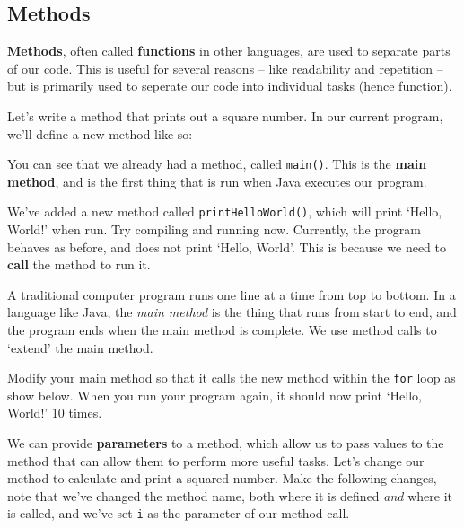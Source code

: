 	\subsection{Methods}
	
	\textbf{Methods}, often called \textbf{functions} in other languages, are used to separate parts of our code. This is useful for several reasons -- like readability and repetition -- but is primarily used to seperate our code into individual tasks (hence function).
	
	Let's write a method that prints out a square number. In our current program, we'll define a new method like so:
	
	
	
	You can see that we already had a method, called \texttt{main()}. This is the \textbf{main method}, and is the first thing that is run when Java executes our program.
	
	We've added a new method called \texttt{printHelloWorld()}, which will print `Hello, World!' when run. Try compiling and running now. Currently, the program behaves as before, and does not print `Hello, World'. This is because we need to \textbf{call} the method to run it.
	
	\begin{aside}
		A traditional computer program runs one line at a time from top to bottom. In a language like Java, the \textit{main method} is the thing that runs from start to end, and the program ends when the main method is complete. We use method calls to `extend' the main method.
	\end{aside}

	Modify your main method so that it calls the new method within the \texttt{for} loop as show below. When you run your program again, it should now print `Hello, World!' 10 times.
	
	
	
	We can provide \textbf{parameters} to a method, which allow us to pass values to the method that can allow them to perform more useful tasks. Let's change our method to calculate and print a squared number. Make the following changes, note that we've changed the method name, both where it is defined \textit{and} where it is called, and we've set \texttt{i} as the parameter of our method call.
	
	
	
	
	
	